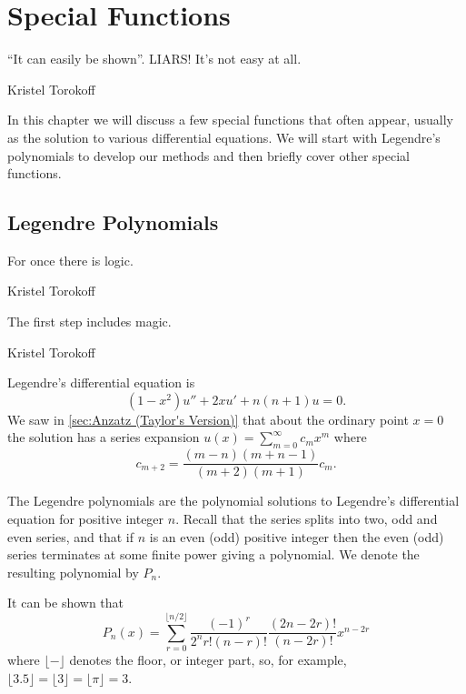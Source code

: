 \documentclass[fleqn]{NotesClass}
\begin{document}
    \chapter{Special Functions}
    \epigraph{\enquote{It can easily be shown}. LIARS! It's not easy at all.}{Kristel Torokoff}
    In this chapter we will discuss a few special functions that often appear, usually as the solution to various differential equations.
    We will start with Legendre's polynomials to develop our methods and then briefly cover other special functions.
    
    \section{Legendre Polynomials}
    \epigraph{For once there is logic.}{Kristel Torokoff}
    \epigraph{The first step includes magic.}{Kristel Torokoff}
    Legendre's differential equation is
    \begin{equation}
        (1 - x^2)u'' + 2xu' + n(n + 1)u = 0.
    \end{equation}
    We saw in \cref{sec:Anzatz (Taylor's Version)} that about the ordinary point \(x = 0\) the solution has a series expansion \(u(x) = \sum_{m=0}^{\infty} c_mx^m\) where
    \begin{equation}
        c_{m+2} = \frac{(m - n)(m + n - 1)}{(m + 2)(m + 1)}c_m.
    \end{equation}
    
    The Legendre polynomials are the polynomial solutions to Legendre's differential equation for positive integer \(n\).
    Recall that the series splits into two, odd and even series, and that if \(n\) is an even (odd) positive integer then the even (odd) series terminates at some finite power giving a polynomial.
    We denote the resulting polynomial by \(P_n\).
    
    It can be shown that
    \begin{equation}
        P_n(x) = \sum_{r=0}^{\lfloor n/2 \rfloor} \frac{(-1)^r}{2^nr!(n - r)!} \frac{(2n - 2r)!}{(n - 2r)!} x^{n - 2r}
    \end{equation}
    where \(\lfloor - \rfloor\) denotes the floor, or integer part, so, for example, \(\lfloor 3.5 \rfloor = \lfloor 3 \rfloor = \lfloor \pi \rfloor = 3\).
    
\end{document}
